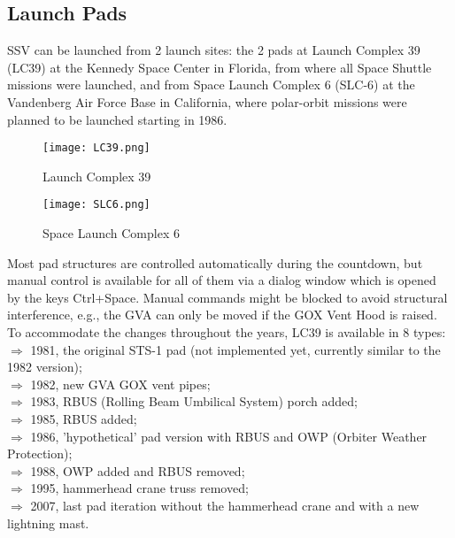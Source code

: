 \documentclass[Space_Shuttle_Vessel_Manual.tex]{subfiles}
\begin{document}
\begin{multicols*}{2}
\subsection{Launch Pads}
SSV can be launched from 2 launch sites: the 2 pads at Launch Complex 39 (LC39) at the Kennedy Space Center in Florida, from where all Space Shuttle missions were launched, and from Space Launch Complex 6 (SLC-6) at the Vandenberg Air Force Base in California, where polar-orbit missions were planned to be launched starting in 1986.
\begin{figure}[H]
  \texttt{[image: LC39.png]}
  \caption{Launch Complex 39}
  \label{fig:LC39}
\end{figure}
\begin{figure}[H]
  \texttt{[image: SLC6.png]}
  \caption{Space Launch Complex 6}
  \label{fig:SLC6}
\end{figure}
\noindent
Most pad structures are controlled automatically during the countdown, but manual control is available for all of them via a dialog window which is opened by the keys Ctrl+Space. Manual commands might be blocked to avoid structural interference, e.g., the GVA can only be moved if the GOX Vent Hood is raised.\\
\noindent
To accommodate the changes throughout the years, LC39 is available in 8 types$\colon$\\
$\Rightarrow$ 1981, the original STS-1 pad (not implemented yet, currently similar to the 1982 version);\\
$\Rightarrow$ 1982, new GVA GOX vent pipes;\\
$\Rightarrow$ 1983, RBUS (Rolling Beam Umbilical System) porch added;\\
$\Rightarrow$ 1985, RBUS added;\\
$\Rightarrow$ 1986, 'hypothetical' pad version with RBUS and OWP (Orbiter Weather Protection);\\
$\Rightarrow$ 1988, OWP added and RBUS removed;\\
$\Rightarrow$ 1995, hammerhead crane truss removed;\\
$\Rightarrow$ 2007, last pad iteration without the hammerhead crane and with a new lightning mast.\\
\end{multicols*}
\end{document}
